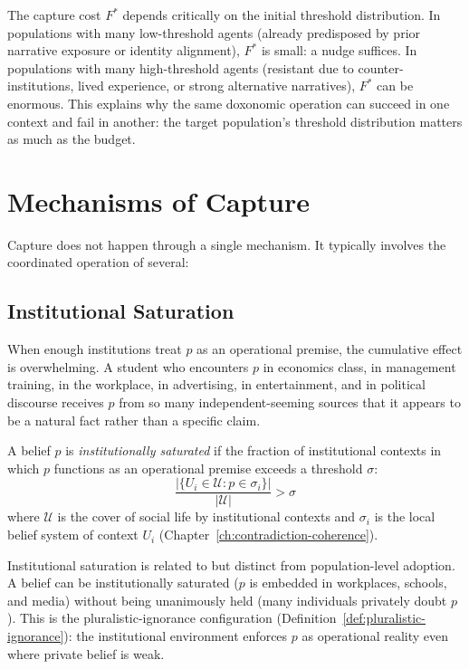 \begin{remark}
The capture cost $F^*$ depends critically on the initial threshold distribution.
In populations with many low-threshold agents (already predisposed by prior narrative exposure or identity alignment), $F^*$ is small: a nudge suffices.
In populations with many high-threshold agents (resistant due to counter-institutions, lived experience, or strong alternative narratives), $F^*$ can be enormous.
This explains why the same doxonomic operation can succeed in one context and fail in another: the target population's threshold distribution matters as much as the budget.
\end{remark}


\section{Mechanisms of Capture}
\label{sec:ch8-mechanisms}

Capture does not happen through a single mechanism.
It typically involves the coordinated operation of several:

\subsection{Institutional Saturation}

When enough institutions treat $p$ as an operational premise, the cumulative effect is overwhelming.
A student who encounters $p$ in economics class, in management training, in the workplace, in advertising, in entertainment, and in political discourse receives $p$ from so many independent-seeming sources that it appears to be a natural fact rather than a specific claim.

\begin{definition}
\label{def:saturation}
A belief $p$ is \emph{institutionally saturated} if the fraction of institutional contexts in which $p$ functions as an operational premise exceeds a threshold $\sigma$:
\[
  \frac{|\{U_i \in \mathcal{U} : p \in \sigma_i\}|}{|\mathcal{U}|} > \sigma
\]
where $\mathcal{U}$ is the cover of social life by institutional contexts and $\sigma_i$ is the local belief system of context $U_i$ (Chapter~\ref{ch:contradiction-coherence}).
\end{definition}

Institutional saturation is related to but distinct from population-level adoption.
A belief can be institutionally saturated ($p$ is embedded in workplaces, schools, and media) without being unanimously held (many individuals privately doubt $p$).
This is the pluralistic-ignorance configuration (Definition~\ref{def:pluralistic-ignorance}): the institutional environment enforces $p$ as operational reality even where private belief is weak.

